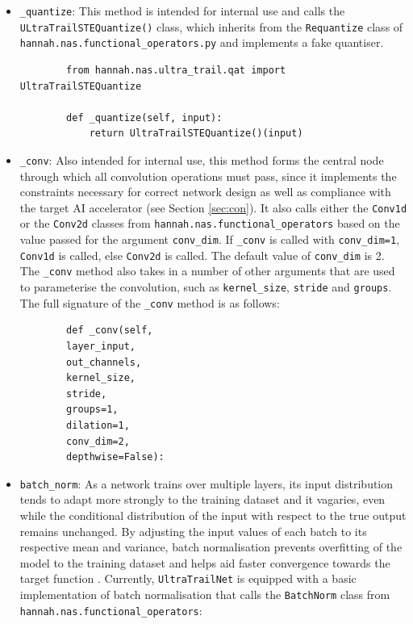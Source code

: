 \documentclass[11pt,a4paper, open=any]{scrbook}
\newcounter{constraint}[chapter]
\newcommand{\py}[1]{\texttt{#1}}
\begin{document}
\begin{itemize}[
	label={},
	parsep=0pt,
	partopsep=0pt,
	itemsep=16pt
	]
	\item \py{_quantize}: This method is intended for internal use and calls the \py{ULtraTrailSTEQuantize()} class, which inherits from the \py{Requantize} class of \py{hannah.nas.functional_operators.py} and implements a fake quantiser.
	
	\begin{verbatim}
		from hannah.nas.ultra_trail.qat import UltraTrailSTEQuantize
		
		def _quantize(self, input):
			return UltraTrailSTEQuantize()(input)
	\end{verbatim}

	
	\item \py{_conv}: Also intended for internal use, this method forms the central node through which all convolution operations must pass, since it implements the constraints necessary for correct network design as well as compliance with the target AI accelerator (see Section \ref{sec:con}). It also calls either the \py{Conv1d} or the \py{Conv2d} classes from \py{hannah.nas.functional_operators} based on the value passed for the argument \py{conv_dim}. If \py{_conv} is called with \py{conv_dim=1}, \py{Conv1d} is called, else \py{Conv2d} is called. The default value of \py{conv_dim} is 2. The \py{_conv} method also takes in a number of other arguments that are used to parameterise the convolution, such as \py{kernel_size}, \py{stride} and \py{groups}. The full signature of the \py{_conv} method is as follows:
	
	\begin{verbatim}
		def _conv(self,
		layer_input,
		out_channels,
		kernel_size,
		stride,
		groups=1,
		dilation=1,
		conv_dim=2,
		depthwise=False):
	\end{verbatim}
	
	\item \py{batch_norm}: As a network trains over multiple layers, its input distribution tends to adapt more strongly to the training dataset and it vagaries, even while the conditional distribution of the input with respect to the true output remains unchanged. By adjusting the input values of each batch to its respective mean and variance, batch normalisation prevents overfitting of the model to the training dataset and helps aid faster convergence towards the target function \cite{geeksBN}. Currently, \py{UltraTrailNet} is equipped with a basic implementation of batch normalisation that calls the \py{BatchNorm} class from \py{hannah.nas.functional_operators}:
	

\end{itemize}
\end{document}
